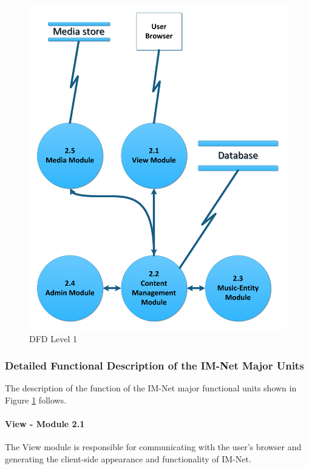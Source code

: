 \documentclass[letterpaper,12pt]{article}
\begin{document}
{\begin{figure}[h!]
\centering
\includegraphics[scale=0.6]{DFD_level_1.pdf}
\caption{DFD Level 1}
\label{fig:DFD_level_1}
\end{figure}
 
\textcolor{subsubsection}{\subsubsection{Detailed Functional Description of the IM-Net Major Units}}

The description of the function of the IM-Net major functional units shown in Figure \ref{fig:DFD_level_1} follows.

\paragraph{View - Module 2.1}
The View module is responsible for communicating with the user's browser and generating the client-side appearance and functionality of IM-Net.

}
\end{document}
